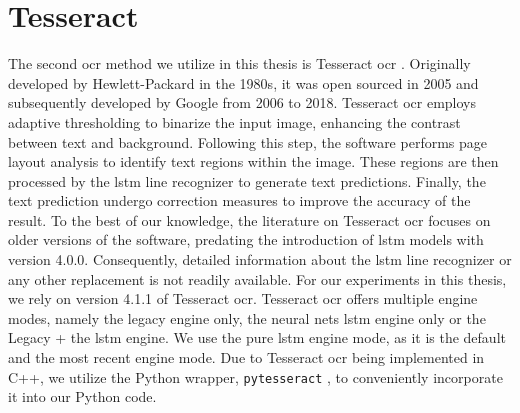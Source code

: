 \section{Tesseract}
\label{subsec:tesseract}

The second \gls{ocr} method we utilize in this thesis is Tesseract \gls{ocr} \cite{tesseract_legacy_2007}\cite{tesseract_github_2023}\cite{tesseract_architecture_2016}.
Originally developed by Hewlett-Packard in the 1980s, it was open sourced in 2005 and subsequently developed by Google from 2006 to 2018.
Tesseract \gls{ocr} employs adaptive thresholding to binarize the input image, enhancing the contrast between text and background.
Following this step, the software performs page layout analysis to identify text regions within the image.
These regions are then processed by the \gls{lstm} line recognizer to generate text predictions.
Finally, the text prediction undergo correction measures to improve the accuracy of the result.
To the best of our knowledge, the literature on Tesseract \gls{ocr} focuses on older versions of the software, predating the introduction of \gls{lstm} models with version 4.0.0.
Consequently, detailed information about the \gls{lstm} line recognizer or any other replacement is not readily available.
For our experiments in this thesis, we rely on version 4.1.1 of Tesseract \gls{ocr}.
Tesseract \gls{ocr} offers multiple engine modes, namely the legacy engine only, the neural nets \gls{lstm} engine only or the Legacy + the \gls{lstm} engine.
We use the pure \gls{lstm} engine mode, as it is the default and the most recent engine mode.
Due to Tesseract \gls{ocr} being implemented in C++, we utilize the Python wrapper, \texttt{pytesseract} \cite{pytesseract_2022}, to conveniently incorporate it into our Python code.

